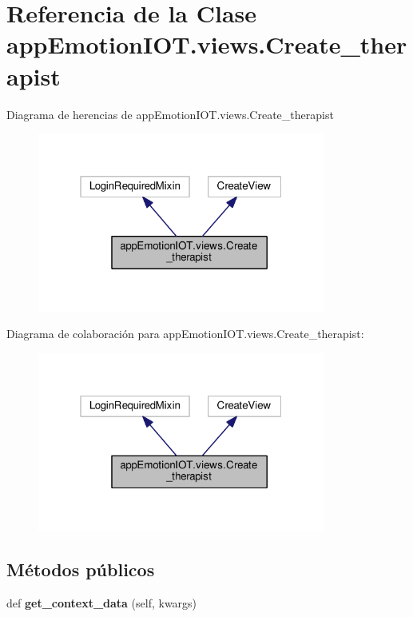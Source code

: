 \hypertarget{classappEmotionIOT_1_1views_1_1Create__therapist}{}\section{Referencia de la Clase app\+Emotion\+I\+O\+T.\+views.\+Create\+\_\+therapist}
\label{classappEmotionIOT_1_1views_1_1Create__therapist}


Diagrama de herencias de app\+Emotion\+I\+O\+T.\+views.\+Create\+\_\+therapist
\nopagebreak
\begin{figure}[H]
\begin{center}
\leavevmode
\includegraphics[width=268pt]{classappEmotionIOT_1_1views_1_1Create__therapist__inherit__graph}
\end{center}
\end{figure}


Diagrama de colaboración para app\+Emotion\+I\+O\+T.\+views.\+Create\+\_\+therapist\+:
\nopagebreak
\begin{figure}[H]
\begin{center}
\leavevmode
\includegraphics[width=268pt]{classappEmotionIOT_1_1views_1_1Create__therapist__coll__graph}
\end{center}
\end{figure}
\subsection*{Métodos públicos}
\begin{DoxyCompactItemize}
\item 
def {\bfseries get\+\_\+context\+\_\+data} (self, kwargs)\hypertarget{classappEmotionIOT_1_1views_1_1Create__therapist_a9633e1a901051f215c04eab9a08d66cc}{}\label{classappEmotionIOT_1_1views_1_1Create__therapist_a9633e1a901051f215c04eab9a08d66cc}

\end{DoxyCompactItemize}
